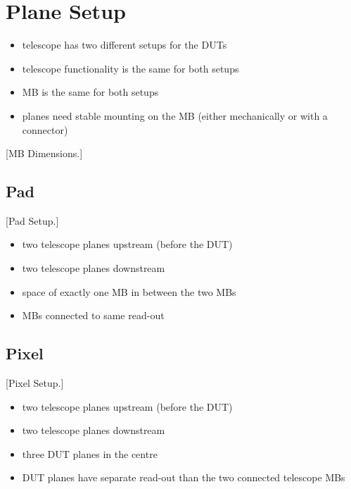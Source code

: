 \section{Plane Setup}
\begin{itemize}
	\item telescope has two different setups for the \acp{DUT}
	\item telescope functionality is the same for both setups
	\item \ac{MB} is the same for both setups
	\item planes need stable mounting on the \ac{MB} (either mechanically or with a connector)
\end{itemize}
[\ac{MB} Dimensions.]

\subsection{Pad}
[Pad Setup.]
\begin{itemize}
	\item two telescope planes upstream (before the \ac{DUT})
	\item two telescope planes downstream
	\item space of exactly one \ac{MB} in between the two \acp{MB}
	\item \acp{MB} connected to same read-out
\end{itemize}

\subsection{Pixel}
[Pixel Setup.]
\begin{itemize}
	\item two telescope planes upstream (before the \ac{DUT})
	\item two telescope planes downstream
	\item three \ac{DUT} planes in the centre
	\item \ac{DUT} planes have separate read-out than the two connected telescope \acp{MB}
\end{itemize}




